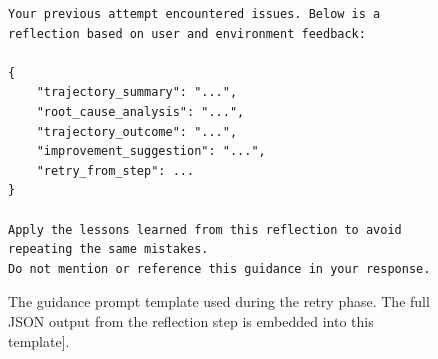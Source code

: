 \begin{figure}[t]
\centering
\begin{tcolorbox}[
    colback=gray!5,
    colframe=gray!75,
    title=Retry Guidance Template,
    fonttitle=\bfseries,
    width=\textwidth
]
\begin{lstlisting}[basicstyle=\ttfamily\scriptsize, breaklines=true]
Your previous attempt encountered issues. Below is a reflection based on user and environment feedback:

{
    "trajectory_summary": "...",
    "root_cause_analysis": "...",
    "trajectory_outcome": "...",
    "improvement_suggestion": "...",
    "retry_from_step": ...
}

Apply the lessons learned from this reflection to avoid repeating the same mistakes.
Do not mention or reference this guidance in your response.
\end{lstlisting}
\end{tcolorbox}
\caption{The guidance prompt template used during the retry phase. The full JSON output from the reflection step is embedded into this template].}
\label{fig:guidance_prompt}
\end{figure}

